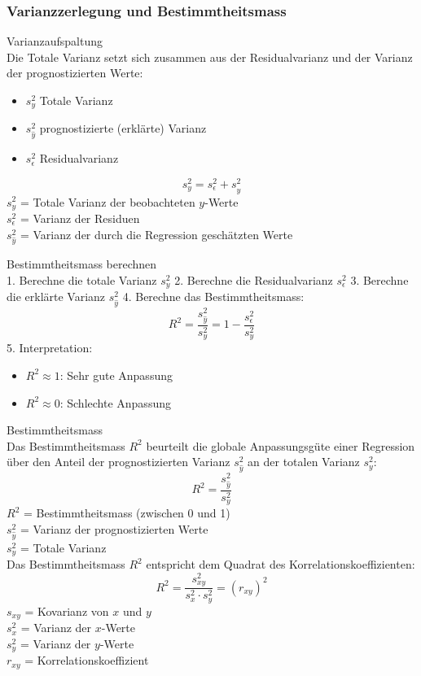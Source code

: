 \subsubsection{Varianzzerlegung und Bestimmtheitsmass}

\begin{concept}{Varianzaufspaltung}\\
Die Totale Varianz setzt sich zusammen aus der Residualvarianz und der Varianz der prognostizierten Werte:
\begin{itemize}
  \item $s_y^2$ Totale Varianz
  \item $s_{\hat{y}}^2$ prognostizierte (erklärte) Varianz
  \item $s_{\epsilon}^2$ Residualvarianz
\end{itemize}

$$
s_y^2=s_{\epsilon}^2+s_{\hat{y}}^2
$$
$s_y^2$ = Totale Varianz der beobachteten $y$-Werte\\
$s_{\epsilon}^2$ = Varianz der Residuen\\
$s_{\hat{y}}^2$ = Varianz der durch die Regression geschätzten Werte\\
\end{concept}

\begin{KR}{Bestimmtheitsmass berechnen}\\
1. Berechne die totale Varianz $s_y^2$
2. Berechne die Residualvarianz $s_{\epsilon}^2$
3. Berechne die erklärte Varianz $s_{\hat{y}}^2$
4. Berechne das Bestimmtheitsmass:
   $$R^2 = \frac{s_{\hat{y}}^2}{s_y^2} = 1 - \frac{s_{\epsilon}^2}{s_y^2}$$
5. Interpretation:
   \begin{itemize}
     \item $R^2 \approx 1$: Sehr gute Anpassung
     \item $R^2 \approx 0$: Schlechte Anpassung
   \end{itemize}
\end{KR}

\begin{theorem}{Bestimmtheitsmass}\\
Das Bestimmtheitsmass $R^2$ beurteilt die globale Anpassungsgüte einer Regression über den Anteil der prognostizierten Varianz $s_{\hat{y}}^2$ an der totalen Varianz $s_y^2$:
$$
R^2=\frac{s_{\hat{y}}^2}{s_y^2}
$$
$R^2$ = Bestimmtheitsmass (zwischen 0 und 1)\\
$s_{\hat{y}}^2$ = Varianz der prognostizierten Werte\\
$s_y^2$ = Totale Varianz\\

Das Bestimmtheitsmass $R^2$ entspricht dem Quadrat des Korrelationskoeffizienten:
$$
R^2=\frac{s_{xy}^2}{s_x^2 \cdot s_y^2}=(r_{xy})^2
$$
$s_{xy}$ = Kovarianz von $x$ und $y$\\
$s_x^2$ = Varianz der $x$-Werte\\
$s_y^2$ = Varianz der $y$-Werte\\
$r_{xy}$ = Korrelationskoeffizient\\
\end{theorem}

